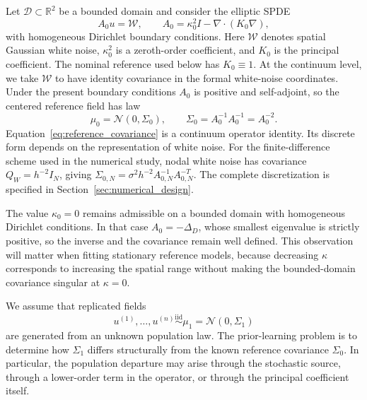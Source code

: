 \documentclass[11pt]{article}
\numberwithin{table}{section}
\numberwithin{figure}{section}
\begin{document}
Let $\mathcal D\subset\mathbb R^2$ be a bounded domain and consider the elliptic SPDE
\begin{equation}
    A_0 u = \mathcal W,
    \qquad
    A_0
    =
    \kappa_0^2 I
    -
    \nabla\!\cdot\!\left(K_0\nabla\right),
    \label{eq:reference_spde}
\end{equation}
with homogeneous Dirichlet boundary conditions. Here $\mathcal W$ denotes spatial Gaussian white noise, $\kappa_0^2$ is a zeroth-order coefficient, and $K_0$ is the principal coefficient. The nominal reference used below has $K_0\equiv1$. At the continuum level, we take $\mathcal W$ to have identity covariance in the formal white-noise coordinates. Under the present boundary conditions $A_0$ is positive and self-adjoint, so the centered reference field has law
\begin{equation}
    \mu_0
    =
    \mathcal N(0,\Sigma_0),
    \qquad
    \Sigma_0
    =
    A_0^{-1}A_0^{-1}
    =
    A_0^{-2}.
    \label{eq:reference_covariance}
\end{equation}
Equation~\eqref{eq:reference_covariance} is a continuum operator identity. Its discrete form depends on the representation of white noise. For the finite-difference scheme used in the numerical study, nodal white noise has covariance $Q_W=h^{-2}I_N$, giving $\Sigma_{0,N}=\sigma^2h^{-2}A_{0,N}^{-1}A_{0,N}^{-T}$. The complete discretization is specified in Section~\ref{sec:numerical_design}.

The value $\kappa_0=0$ remains admissible on a bounded domain with homogeneous Dirichlet conditions. In that case $A_0=-\Delta_D$, whose smallest eigenvalue is strictly positive, so the inverse and the covariance remain well defined. This observation will matter when fitting stationary reference models, because decreasing $\kappa$ corresponds to increasing the spatial range without making the bounded-domain covariance singular at $\kappa=0$.

We assume that replicated fields
\begin{equation}
    u^{(1)},\ldots,u^{(n)}
    \overset{\mathrm{iid}}{\sim}
    \mu_1
    =
    \mathcal N(0,\Sigma_1)
    \label{eq:population_replicates}
\end{equation}
are generated from an unknown population law. The prior-learning problem is to determine how $\Sigma_1$ differs structurally from the known reference covariance $\Sigma_0$. In particular, the population departure may arise through the stochastic source, through a lower-order term in the operator, or through the principal coefficient itself.
\end{document}
